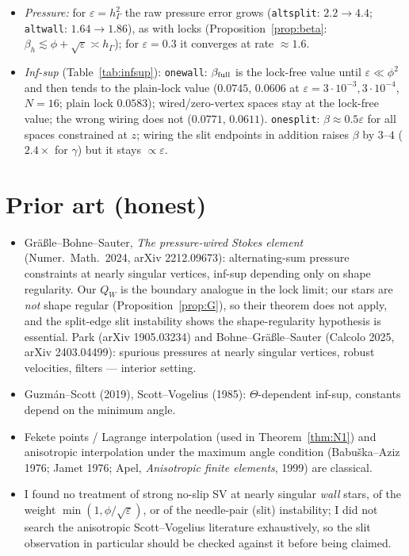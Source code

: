 \documentclass[11pt]{article}
\theoremstyle{remark}
\newcommand{\hG}{h_\Gamma}
\begin{document}
\begin{itemize}
($N=96$), local rate $1.03$ (predicted $1$); for $\varepsilon=\hG$ the excess is $\le2\%$ of $E$ (predicted rate $3/2$).
\item \emph{Pressure:} for $\varepsilon=\hG^2$ the raw pressure error grows (\texttt{altsplit}: $2.2\to4.4$; \texttt{altwall}: $1.64\to1.86$), as
with locks (Proposition~\ref{prop:beta}: $\beta_h\lesssim\phi+\sqrt\varepsilon\asymp\hG$); for $\varepsilon=0.3$ it converges at rate $\approx1.6$.
\item \emph{Inf-sup} (Table~\ref{tab:infsup}): \texttt{onewall}: $\beta_{\rm full}$ is the lock-free value until $\varepsilon\ll\phi^2$ and then tends to the
plain-lock value ($0.0745$, $0.0606$ at $\varepsilon=3\cdot10^{-3},3\cdot10^{-4}$, $N=16$; plain lock $0.0583$); wired/zero-vertex spaces stay at the
lock-free value; the wrong wiring does not ($0.0771$, $0.0611$). \texttt{onesplit}: $\beta\approx0.5\varepsilon$ for all spaces constrained at $z$;
wiring the slit endpoints in addition raises $\beta$ by $3$--$4$ ($2.4\times$ for $\gamma$) but it stays $\propto\varepsilon$.
\end{itemize}

\section{Prior art (honest)}
\begin{itemize}
\item Gr\"a\ss le--Bohne--Sauter, \emph{The pressure-wired Stokes element} (Numer.\ Math.\ 2024, arXiv 2212.09673): alternating-sum pressure
constraints at nearly singular vertices, inf-sup depending only on shape regularity. Our $Q_W$ is the boundary analogue in the
lock limit; our stars are \emph{not} shape regular (Proposition~\ref{prop:G}), so their theorem does not apply, and the split-edge
slit instability shows the shape-regularity hypothesis is essential. Park (arXiv 1905.03234) and Bohne--Gr\"a\ss le--Sauter
(Calcolo 2025, arXiv 2403.04499): spurious pressures at nearly singular vertices, robust velocities, filters --- interior setting.
\item Guzm\'an--Scott (2019), Scott--Vogelius (1985): $\Theta$-dependent inf-sup, constants depend on the minimum angle.
\item Fekete points / Lagrange interpolation (used in Theorem~\ref{thm:N1}) and anisotropic interpolation under the maximum angle
condition (Babu\v ska--Aziz 1976; Jamet 1976; Apel, \emph{Anisotropic finite elements}, 1999) are classical.
\item I found no treatment of strong no-slip SV at nearly singular \emph{wall} stars, of the weight $\min(1,\phi/\sqrt\varepsilon)$, or of the
needle-pair (slit) instability; I did not search the anisotropic Scott--Vogelius literature exhaustively, so the slit observation in
particular should be checked against it before being claimed.
\end{itemize}
\end{document}
